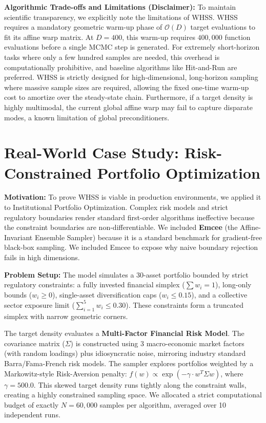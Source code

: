 \documentclass[12pt]{article}
\begin{document}
\textbf{Algorithmic Trade-offs and Limitations (Disclaimer):} 
To maintain scientific transparency, we explicitly note the limitations of WHSS. WHSS requires a mandatory geometric warm-up phase of $\mathcal{O}(D)$ target evaluations to fit its affine warp matrix. At $D=400$, this warm-up requires $400{,}000$ function evaluations before a single MCMC step is generated. For extremely short-horizon tasks where only a few hundred samples are needed, this overhead is computationally prohibitive, and baseline algorithms like Hit-and-Run are preferred. WHSS is strictly designed for high-dimensional, long-horizon sampling where massive sample sizes are required, allowing the fixed one-time warm-up cost to amortize over the steady-state chain. Furthermore, if a target density is highly multimodal, the current global affine warp may fail to capture disparate modes, a known limitation of global preconditioners.

\section{Real-World Case Study: Risk-Constrained Portfolio Optimization}
\textbf{Motivation:} To prove WHSS is viable in production environments, we applied it to Institutional Portfolio Optimization. Complex risk models and strict regulatory boundaries render standard first-order algorithms ineffective because the constraint boundaries are non-differentiable. We included \textbf{Emcee} (the Affine-Invariant Ensemble Sampler) because it is a standard benchmark for gradient-free black-box sampling. We included Emcee to expose why naive boundary rejection fails in high dimensions.

\textbf{Problem Setup:} The model simulates a 30-asset portfolio bounded by strict regulatory constraints: a fully invested financial simplex ($\sum w_i = 1$), long-only bounds ($w_i \ge 0$), single-asset diversification caps ($w_i \le 0.15$), and a collective sector exposure limit ($\sum_{i=1}^5 w_i \le 0.30$). These constraints form a truncated simplex with narrow geometric corners. 

The target density evaluates a \textbf{Multi-Factor Financial Risk Model}. The covariance matrix ($\Sigma$) is constructed using 3 macro-economic market factors (with random loadings) plus idiosyncratic noise, mirroring industry standard Barra/Fama-French risk models. The sampler explores portfolios weighted by a Markowitz-style Risk-Aversion penalty: $f(w) \propto \exp(-\gamma \cdot w^T \Sigma w)$, where $\gamma=500.0$. This skewed target density runs tightly along the constraint walls, creating a highly constrained sampling space. We allocated a strict computational budget of exactly $N = 60{,}000$ samples per algorithm, averaged over 10 independent runs.
\end{document}
